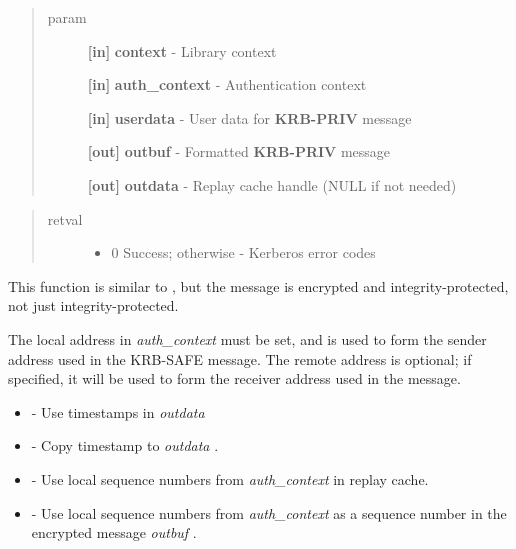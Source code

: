 \documentclass[letterpaper,10pt,english]{sphinxmanual}
\begin{document}
\begin{quote}\begin{description}
\item[{param}] \leavevmode
\textbf{{[}in{]}} \textbf{context} - Library context

\textbf{{[}in{]}} \textbf{auth\_context} - Authentication context

\textbf{{[}in{]}} \textbf{userdata} - User data for \textbf{KRB-PRIV} message

\textbf{{[}out{]}} \textbf{outbuf} - Formatted \textbf{KRB-PRIV} message

\textbf{{[}out{]}} \textbf{outdata} - Replay cache handle (NULL if not needed)

\end{description}\end{quote}
\begin{quote}\begin{description}
\item[{retval}] \leavevmode\begin{itemize}
\item {} 
0   Success; otherwise - Kerberos error codes

\end{itemize}

\end{description}\end{quote}

This function is similar to {\hyperref[appdev/refs/api/krb5_mk_safe:c.krb5_mk_safe]{}} , but the message is encrypted and integrity-protected, not just integrity-protected.

The local address in \emph{auth\_context} must be set, and is used to form the sender address used in the KRB-SAFE message. The remote address is optional; if specified, it will be used to form the receiver address used in the message.
\begin{itemize}
\item {} 
{\hyperref[appdev/refs/macros/KRB5_AUTH_CONTEXT_DO_TIME:KRB5_AUTH_CONTEXT_DO_TIME]{}} - Use timestamps in \emph{outdata}

\item {} 
{\hyperref[appdev/refs/macros/KRB5_AUTH_CONTEXT_RET_TIME:KRB5_AUTH_CONTEXT_RET_TIME]{}} - Copy timestamp to \emph{outdata} .

\item {} 
{\hyperref[appdev/refs/macros/KRB5_AUTH_CONTEXT_DO_SEQUENCE:KRB5_AUTH_CONTEXT_DO_SEQUENCE]{}} - Use local sequence numbers from \emph{auth\_context} in replay cache.

\item {} 
{\hyperref[appdev/refs/macros/KRB5_AUTH_CONTEXT_RET_SEQUENCE:KRB5_AUTH_CONTEXT_RET_SEQUENCE]{}} - Use local sequence numbers from \emph{auth\_context} as a sequence number in the encrypted message \emph{outbuf} .

\end{itemize}
\end{document}
